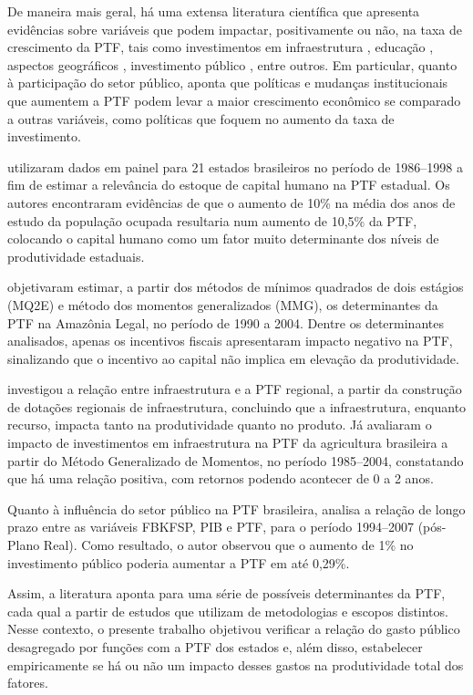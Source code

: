 \documentclass[
  12pt,
  a4paper,
  oneside,
  brazil,
  chapter=TITLE,
  section=TITLE
]{abntex2}
\begin{document}
De maneira mais geral, há uma extensa literatura científica que apresenta evidências sobre variáveis que podem impactar, positivamente ou não, na taxa de crescimento da PTF, tais como investimentos em infraestrutura \cite{mendes2009,benitez1999}, educação \cite{tavares2001}, aspectos geográficos \cite{gomes2008}, investimento público \cite{godoy2008}, entre outros. Em particular, quanto à participação do setor público,  aponta que políticas e mudanças institucionais que aumentem a PTF podem levar a maior crescimento econômico se comparado a outras variáveis, como políticas que foquem no aumento da taxa de investimento.

 utilizaram dados em painel para 21 estados brasileiros no período de 1986--1998 a fim de estimar a relevância do estoque de capital humano na PTF estadual. Os autores encontraram evidências de que o aumento de 10\% na média dos anos de estudo da população ocupada resultaria num aumento de 10,5\% da PTF, colocando o capital humano como um fator muito determinante dos níveis de produtividade estaduais.

 objetivaram estimar, a partir dos métodos de mínimos quadrados de dois estágios (MQ2E) e método dos momentos generalizados (MMG), os determinantes da PTF na Amazônia Legal, no período de 1990 a 2004. Dentre os determinantes analisados, apenas os incentivos fiscais apresentaram impacto negativo na PTF, sinalizando que o incentivo ao capital não implica em elevação da produtividade.

 investigou a relação entre infraestrutura e a PTF regional, a partir da construção de dotações regionais de infraestrutura, concluindo que a infraestrutura, enquanto recurso, impacta tanto na produtividade quanto no produto. Já  avaliaram o impacto de investimentos em infraestrutura na PTF da agricultura brasileira a partir do Método Generalizado de Momentos, no período 1985--2004, constatando que há uma relação positiva, com retornos podendo acontecer de 0 a 2 anos.

Quanto à influência do setor público na PTF brasileira,  analisa a relação de longo prazo entre as variáveis FBKFSP, PIB e PTF, para o período 1994--2007 (pós-Plano Real). Como resultado, o autor observou que o aumento de 1\% no investimento público poderia aumentar a PTF em até 0,29\%.

Assim, a literatura aponta para uma série de possíveis determinantes da PTF, cada qual a partir de estudos que utilizam de metodologias e escopos distintos. Nesse contexto, o presente trabalho objetivou verificar a relação do gasto público desagregado por funções com a PTF dos estados e, além disso, estabelecer empiricamente se há ou não um impacto desses gastos na produtividade total dos fatores.
\end{document}
